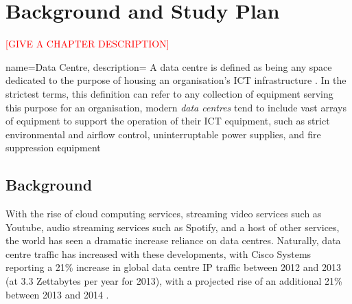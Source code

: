 \def\baselinestretch{1}

\chapter{Background and Study Plan}
\label{chapter:Intro}

\def\baselinestretch{1.66}



\textcolor{red}{[GIVE A CHAPTER DESCRIPTION]}

\goodbreak
{}
{
  name=Data Centre,
  description=
  {
     A data centre is defined as being any space dedicated to the purpose of housing an
     organisation's ICT infrastructure \cite{InteraxionWhatIsADataCentre}. In the strictest terms, this
     definition can refer to any collection of equipment serving this purpose for an organisation, modern
     \emph{data centres} tend to include vast arrays of equipment to support the operation of their ICT
     equipment, such as strict environmental and airflow control, uninterruptable power supplies, and
     fire suppression equipment 
     \cite{PaloAltoWhatIsADataCentre}\cite{DataCenterDefinitionGartnerITGlossary}
  }
}
     
\section{Background}
\label{sec:Background}
With the rise of cloud computing services, streaming video services such as Youtube, audio streaming services such as Spotify, and a host of other services, the world has seen a dramatic increase reliance on \gls{data centre}s. Naturally, \gls{data centre} traffic has increased with these developments, with Cisco Systems reporting a 21\% increase in global \gls{data centre} IP traffic between 2012 and 2013 (at 3.3 Zettabytes per year for 2013), with a projected rise of an additional 21\% between 2013 and 2014 \cite{CiscoGlobalCloudIndex:ForecastAndMethodology}.


